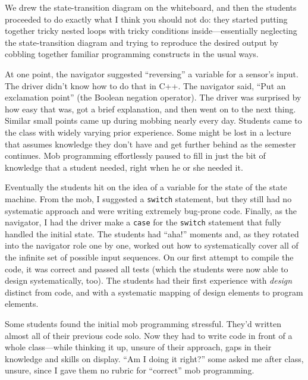 \documentclass{article}
\begin{document}
We drew the state-transition diagram on the whiteboard, and then the students
proceeded to do exactly what I think you should not do: they started putting
together tricky nested loops with tricky conditions inside---essentially
neglecting the state-transition diagram and trying to reproduce the desired
output by cobbling together familiar programming constructs in the usual ways.

At one point, the navigator suggested ``reversing'' a variable for a sensor's
input. The driver didn't know how to do that in C++. The navigator said, ``Put
an exclamation point'' (the Boolean negation operator). The driver was
surprised by how easy that was, got a brief explanation, and then went on to
the next thing. Similar small points came up during mobbing nearly every day.
Students came to the class with widely varying prior experience. Some might be
lost in a lecture that assumes knowledge they don't have and get further
behind as the semester continues.  Mob programming effortlessly paused to fill
in just the bit of knowledge that a student needed, right when he or she
needed it.


Eventually the students hit on the idea of a variable for the state of the
state machine. From the mob, I suggested a \texttt{switch} statement,
but they still had no systematic approach and were writing
extremely bug-prone code. Finally, as the navigator, I had the driver make a
\texttt{case} for the \texttt{switch} statement that fully handled the initial
state.  The students had ``aha!'' moments and, as they rotated into the
navigator role one by one, worked out how to systematically cover all of the
infinite set of possible input sequences. On our first attempt to compile the
code, it was correct and passed all tests (which the students were now able to
design systematically, too). The students had their first experience with
\emph{design} distinct from code, and with a systematic mapping of design
elements to program elements.

Some students found the initial mob programming stressful. They'd written
almost all of their previous code solo. Now they had to write code in front of
a whole class---while thinking it up, unsure of their approach, gaps in their
knowledge and skills on display. ``Am I doing it right?'' some asked me after
class, unsure, since I gave them no rubric for ``correct'' mob programming.
\end{document}
